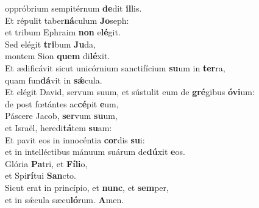 \evenverse oppróbrium sempitérnum \textbf{de}dit \textbf{il}lis.\\
\oddverse Et répulit taber\textbf{ná}culum \textbf{Jo}seph:~\*\\
\oddverse et tribum Ephraim \textbf{non} e\textbf{lé}git.\\
\evenverse Sed elégit \textbf{tri}bum \textbf{Ju}da,~\*\\
\evenverse montem Sion \textbf{quem} di\textbf{lé}xit.\\
\oddverse Et ædificávit sicut unicórnium sanctifícium \textbf{su}um in \textbf{ter}ra,~\*\\
\oddverse quam fun\textbf{dá}vit in \textbf{sǽ}cula.\\
\evenverse Et elégit David, servum suum, et sústulit eum de \textbf{gré}gibus \textbf{ó}\textbf{vi}um:~\*\\
\evenverse de post fœtántes ac\textbf{cé}pit \textbf{e}um,\\
\oddverse Páscere Jacob, \textbf{ser}vum \textbf{su}um,~\*\\
\oddverse et Israël, heredi\textbf{tá}tem \textbf{su}am:\\
\evenverse Et pavit eos in innocéntia \textbf{cor}dis \textbf{su}i:~\*\\
\evenverse et in intelléctibus mánuum suárum de\textbf{dú}xit \textbf{e}os.\\
\oddverse Glória \textbf{Pa}tri, et \textbf{Fí}\textbf{li}o,~\*\\
\oddverse et Spi\textbf{rí}tui \textbf{San}cto.\\
\evenverse Sicut erat in princípio, et \textbf{nunc}, et \textbf{sem}per,~\*\\
\evenverse et in sǽcula sæcu\textbf{ló}rum. \textbf{A}men.\\
